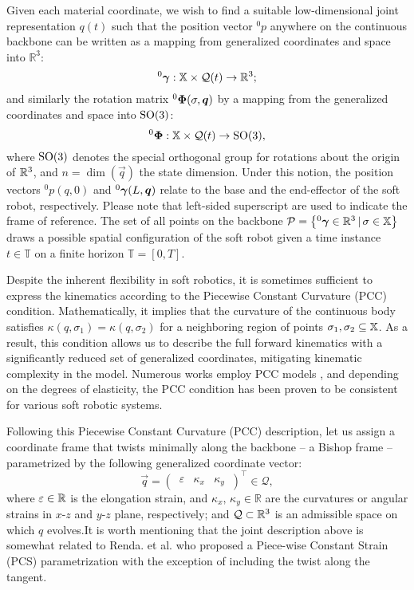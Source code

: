 {Given each material coordinate, we wish to find a suitable low-dimensional joint representation $q(t)$ such that the position vector $^0p$ anywhere on the continuous backbone can be written as a mapping from generalized coordinates and space into $\mathbb{R}^3$:
%
\begin{equation}
^0{\boldsymbol{\gamma}}: \mathbb{X} \times \mathcal{Q}(t) \to \mathbb{R}^3;
\end{equation}
%
and similarly the rotation matrix $^0\boldsymbol{\Phi}(\sigma,\boldsymbol{q})$ by a mapping from the generalized coordinates and space into ${\text{SO}(3)}$:
%
\begin{equation}
^0{\boldsymbol{\Phi}}: \mathbb{X} \times \mathcal{Q}(t) \to {\text{SO}(3)}, \label{eq:phi_map}
\end{equation}
%
where {${\text{SO}(3)}$ denotes the special orthogonal group for rotations about the origin of $\mathbb{R}^3$}, and $n = \dim(\vec{q})$ the state dimension. Under this notion, the position vectors $^0p(q,0)$ and {$^0{\boldsymbol{\gamma}}(L,{\boldsymbol{q}})$} relate to the base and the end-effector of the soft robot, respectively. {Please note that left-sided superscript are used to indicate the frame of reference.} The set of all points on the backbone $\mathcal{P} = \left\{^0{\boldsymbol{\gamma}} \in \mathbb{R}^3\, |\, \sigma \in \mathbb{X} \right\}$ draws a possible {spatial} configuration of the soft robot given {a time instance $t \in \mathbb{T}$ on a finite horizon $\mathbb{T} = [0,T]$}.
%
\begin{intermez}
Despite the inherent flexibility in soft robotics, it is sometimes sufficient to express the kinematics according to the Piecewise Constant Curvature (PCC) condition. Mathematically, it implies that the curvature of the continuous body satisfies $\kappa(q,\sigma_1) = \kappa(q,\sigma_2)$ for a neighboring region of points $\sigma_1,\sigma_2 \subseteq \mathbb{X}$. As a result, this condition allows us to describe the full forward kinematics with a significantly reduced set of generalized coordinates, mitigating kinematic complexity in the model. Numerous works employ PCC models \cite{Falkenhahn2015,Katzschmann2019,Tatlicioglu2007,Marchese2016,Godage2016,Santina2020Pcc}, and depending on the degrees of elasticity, the PCC condition has been proven to be consistent for various soft robotic systems.
\end{intermez}
%
{Following this Piecewise Constant Curvature (PCC) description, let us assign a coordinate frame that twists minimally along the backbone -- a Bishop frame \cite{Bishop1975}-- parametrized by the following generalized coordinate vector:}
%
\begin{equation}
\vec{q} = \begin{pmatrix}
\,\varepsilon & \kappa_x & \kappa_y\,
\end{pmatrix}^\top \in \mathcal{Q},
\label{eq:coordinate}
\end{equation}
%
\noindent where {$\varepsilon \in \mathbb{R}$ is the elongation strain}, and $\kappa_x,\,\kappa_y\in\mathbb{R}$ are the curvatures or angular strains in $x$-$z$ and $y$-$z$ plane, respectively; and $\mathcal{Q} \subset \mathbb{R}^3$ is an admissible space on which $q$ evolves.It is worth mentioning that the joint description above is somewhat related to Renda. et al. \cite{Renda2018} who proposed a Piece-wise Constant Strain (PCS) parametrization with the exception of including the twist along the tangent.

}
